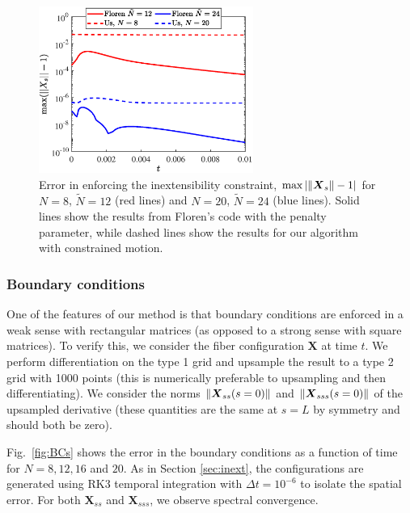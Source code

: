 \begin{figure}
\centering
\includegraphics[width=70mm]{Inextensibility.eps}
\caption{Error in enforcing the inextensibility constraint, $\textrm{max}\left|\left\lVert \mbox{\boldmath $ X $}_s \right\rVert-1\right|$ for $N=8$, $\tilde{N}=12$ (red lines) and $N=20$, $\tilde{N}=24$ (blue lines). Solid lines show the results from Floren's code with the penalty parameter, while dashed lines show the results for our algorithm with constrained motion. }
\label{fig:inext}
\end{figure}

\subsubsection{Boundary conditions}
One of the features of our method is that boundary conditions are enforced in a weak sense with rectangular matrices (as opposed to a strong sense with square matrices). To verify this, we consider the fiber configuration $\bm{X}$ at time $t$. We perform differentiation on the type 1 grid and upsample the result to a type 2 grid with 1000 points (this is numerically preferable to upsampling and then differentiating). We consider the norms $\left\lVert \mbox{\boldmath $ X $}_{ss}(s=0) \right\rVert$ and $\left\lVert \mbox{\boldmath $ X $}_{sss}(s=0) \right\rVert$ of the upsampled derivative (these quantities are the same at $s=L$ by symmetry and should both be zero). 

Fig.\ \ref{fig:BCs} shows the error in the boundary conditions as a function of time for $N=8, 12, 16$ and $20$. As in Section \ref{sec:inext}, the configurations are generated using RK3 temporal integration with $\Delta t =10^{-6}$ to isolate the spatial error. For both $\bm{X}_{ss}$ and $\bm{X}_{sss}$, we observe spectral convergence. 

